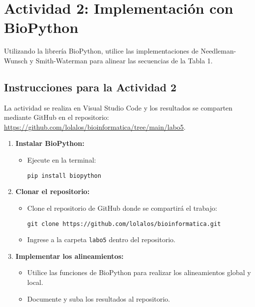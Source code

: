 \documentclass[fleqn,10pt]{article}
\begin{document}
\section{Actividad 2: Implementación con BioPython}

Utilizando la librería BioPython, utilice las implementaciones de Needleman-Wunsch y Smith-Waterman para alinear las secuencias de la Tabla 1.

\subsection*{Instrucciones para la Actividad 2}

La actividad se realiza en Visual Studio Code y los resultados se comparten mediante GitHub en el repositorio: \url{https://github.com/lolalos/bioinformatica/tree/main/labo5}.

\begin{enumerate}
    \item \textbf{Instalar BioPython:}
    \begin{itemize}
        \item Ejecute en la terminal:
        \begin{lstlisting}[style=outputstyle, basicstyle=\ttfamily\footnotesize]
pip install biopython
        \end{lstlisting}
    \end{itemize}
    \item \textbf{Clonar el repositorio:}
    \begin{itemize}
        \item Clone el repositorio de GitHub donde se compartirá el trabajo:
        \begin{lstlisting}[style=outputstyle, basicstyle=\ttfamily\footnotesize]
git clone https://github.com/lolalos/bioinformatica.git
        \end{lstlisting}
        \item Ingrese a la carpeta \texttt{labo5} dentro del repositorio.
    \end{itemize}
    \item \textbf{Implementar los alineamientos:}
    \begin{itemize}
        \item Utilice las funciones de BioPython para realizar los alineamientos global y local.
        \item Documente y suba los resultados al repositorio.
    \end{itemize}
\end{enumerate}
\end{document}

